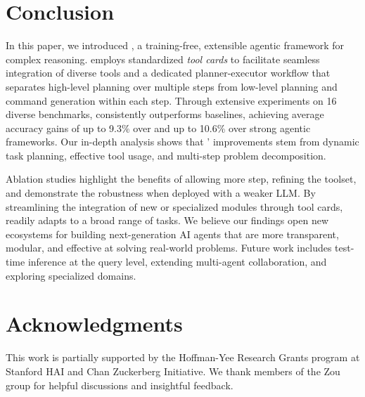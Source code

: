 \section{Conclusion}
\label{sec:conclusion}
In this paper, we introduced \model, a training-free, extensible agentic framework for complex reasoning. \model employs standardized \emph{tool cards} to facilitate seamless integration of diverse tools and a dedicated planner-executor workflow that separates high-level planning over multiple steps from low-level planning and command generation within each step. Through extensive experiments on 16 diverse benchmarks, \model consistently outperforms baselines, achieving average accuracy gains of up to 9.3\% over \gpt and up to 10.6\% over strong agentic frameworks. Our in-depth analysis shows that \model' improvements stem from dynamic task planning, effective tool usage, and multi-step problem decomposition.

Ablation studies highlight the benefits of allowing more step, refining the toolset, and demonstrate the robustness when deployed with a weaker LLM. By streamlining the integration of new or specialized modules through tool cards, \model readily adapts to a broad range of tasks. We believe our findings open new ecosystems for building next-generation AI agents that are more transparent, modular, and effective at solving real-world problems. Future work includes test-time inference at the query level, extending multi-agent collaboration, and exploring specialized domains.

\section*{Acknowledgments}
\label{sec:ack}
This work is partially supported by the Hoffman-Yee Research Grants program at Stanford HAI and Chan Zuckerberg Initiative. We thank members of the Zou group for helpful discussions and insightful feedback.